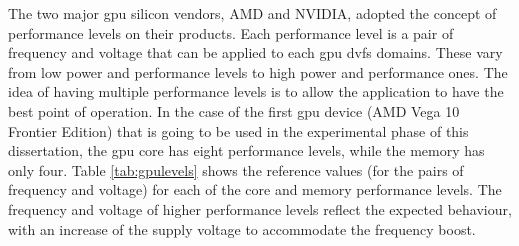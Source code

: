 The two major \acrshort{gpu} silicon vendors, AMD and NVIDIA, adopted the concept of performance levels on their products. Each performance level is a pair of frequency and voltage that can be applied to each \acrshort{gpu} \acrshort{dvfs} domains. These vary from low power and performance levels to high power and performance ones. The idea of having multiple performance levels is to allow the application to have the best point of operation. In the case of the first \acrshort{gpu} device (AMD Vega 10 Frontier Edition) that is going to be used in the experimental phase of this dissertation, the \acrshort{gpu} core has eight performance levels, while the memory has only four. Table \ref{tab:gpulevels} shows the reference values (for the pairs of frequency and voltage) for each of the core and memory performance levels. 
The frequency and voltage of higher performance levels reflect the expected behaviour, with an increase of the supply voltage to accommodate the frequency boost.


